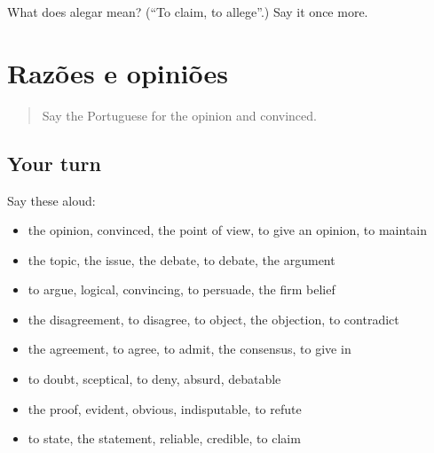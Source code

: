 \begin{tcolorbox}[breakable,colback=teal!4,colframe=teal!35!black,title={Before you move on}]
What does alegar mean? (\textquotedblleft{}To claim, to allege\textquotedblright{}.) Say it once more.
\end{tcolorbox}
\section[(dialogue)]{Razões e opiniões}

\label{lesson:PT-R342-revisao-335-342}



\begin{quote}
Say the Portuguese for the opinion and convinced.
\end{quote}

\subsection*{Your turn}
Say these aloud:

\begin{itemize}
\raggedright
  \item the opinion, convinced, the point of view, to give an opinion, to maintain
  \item the topic, the issue, the debate, to debate, the argument
  \item to argue, logical, convincing, to persuade, the firm belief
  \item the disagreement, to disagree, to object, the objection, to contradict
  \item the agreement, to agree, to admit, the consensus, to give in
  \item to doubt, sceptical, to deny, absurd, debatable
  \item the proof, evident, obvious, indisputable, to refute
  \item to state, the statement, reliable, credible, to claim
\end{itemize}

